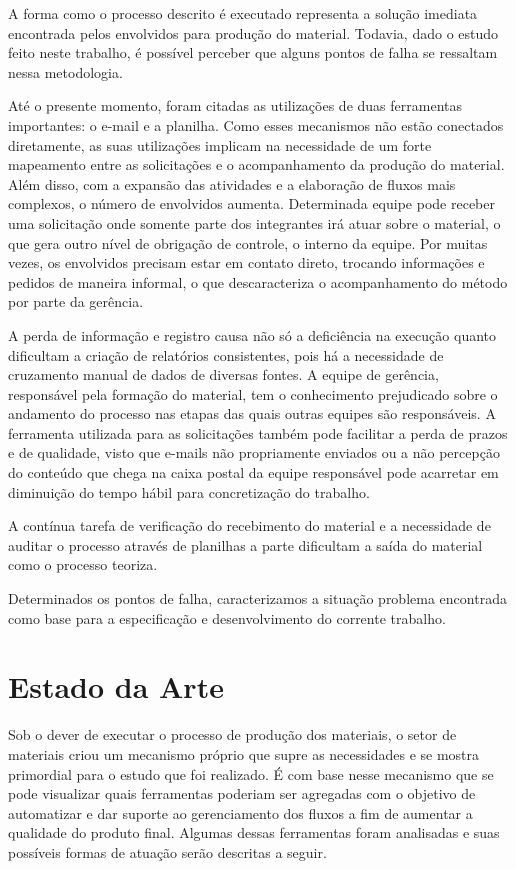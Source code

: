 A forma como o processo descrito é executado representa a solução imediata encontrada pelos envolvidos para produção do material. Todavia, dado o estudo feito neste trabalho, é possível perceber que alguns pontos de falha se ressaltam nessa metodologia. 

Até o presente momento, foram citadas as utilizações de duas ferramentas importantes: o e-mail e a planilha. Como esses mecanismos não estão conectados diretamente, as suas utilizações implicam na necessidade de um forte mapeamento entre as solicitações e o acompanhamento da produção do material. Além disso, com a expansão das atividades e a elaboração de fluxos mais complexos, o número de envolvidos aumenta. Determinada equipe pode receber uma solicitação onde somente parte dos integrantes irá atuar sobre o material, o que gera outro nível de obrigação de controle, o interno da equipe. Por muitas vezes, os envolvidos precisam estar em contato direto, trocando informações e pedidos de maneira informal, o que descaracteriza o acompanhamento do método por parte da gerência. 

A perda de informação e registro causa não só a deficiência na execução quanto dificultam a criação de relatórios consistentes, pois há a necessidade de cruzamento manual de dados de diversas fontes. A equipe de gerência, responsável pela formação do material, tem o conhecimento prejudicado sobre o andamento do processo nas etapas das quais outras equipes são responsáveis. A ferramenta utilizada para as solicitações também pode facilitar a perda de prazos e de qualidade, visto que e-mails não propriamente enviados ou a não percepção do conteúdo que chega na caixa postal da equipe responsável pode acarretar em diminuição do tempo hábil para concretização do trabalho.

A contínua tarefa de verificação do recebimento do material e a necessidade de auditar o processo através de planilhas a parte dificultam a saída do material como o processo teoriza. 

Determinados os pontos de falha, caracterizamos a situação problema encontrada como base para a especificação e desenvolvimento do corrente trabalho.

\section{Estado da Arte}

Sob o dever de executar o processo de produção dos materiais, o setor de materiais criou um mecanismo próprio que supre as necessidades e se mostra primordial para o estudo que foi realizado. É com base nesse mecanismo que se pode visualizar quais ferramentas poderiam ser agregadas com o objetivo de automatizar e dar suporte ao gerenciamento dos fluxos a fim de aumentar a qualidade do produto final. Algumas dessas ferramentas foram analisadas e suas possíveis formas de atuação serão descritas a seguir.

